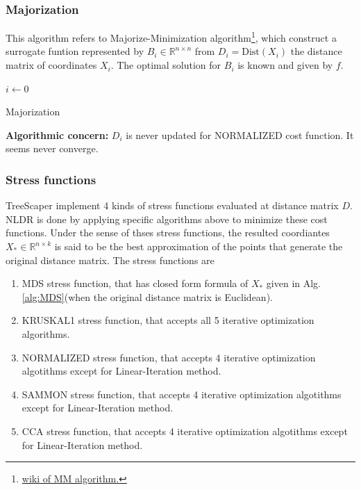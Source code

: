 \documentclass[11pt]{article}
\begin{document}
\subsubsection{Majorization} This algorithm refers to Majorize-Minimization algorithm\footnote{\href{https://en.wikipedia.org/wiki/MM_algorithm}{wiki of MM algorithm.}}, which construct a surrogate funtion represented by $B_i\in \mathbb{R}^{n\times n}$ from $D_i=\text{Dist}(X_i)$ the distance matrix of coordinates $X_i$. The optimal solution for $B_i$ is known and given by $f$. 

\begin{algorithm}[H]
    \DontPrintSemicolon
	$i\gets 0$\;
    \caption{Majorization}
    \label{alg:Majorization}
\end{algorithm}

{\bf Algorithmic concern:} $D_{i}$ is never updated for NORMALIZED cost function. It seems never converge.

\subsubsection{Stress functions} 

TreeScaper implement 4 kinds of stress functions evaluated at distance matrix $D$. NLDR is done by applying specific algorithms above to minimize these cost functions. Under the sense of thses stress functions, the resulted coordiantes $X_*\in \mathbb{R}^{n\times k}$ is said to be the best approximation of the points that generate the original distance matrix. The stress functions are
\begin{enumerate}
	\item MDS stress function, that has closed form formula of $X_*$ given in Alg. \ref{alg:MDS}(when the original distance matrix is Euclidean).
	\item KRUSKAL1 stress function, that accepts all 5 iterative optimization algorithms.
	\item NORMALIZED stress function, that accepts 4 iterative optimization algotithms except for Linear-Iteration method.
	\item SAMMON stress function, that accepts 4 iterative optimization algotithms except for Linear-Iteration method.
	\item CCA stress function, that accepts 4 iterative optimization algotithms except for Linear-Iteration method.
\end{enumerate}
\end{document}
